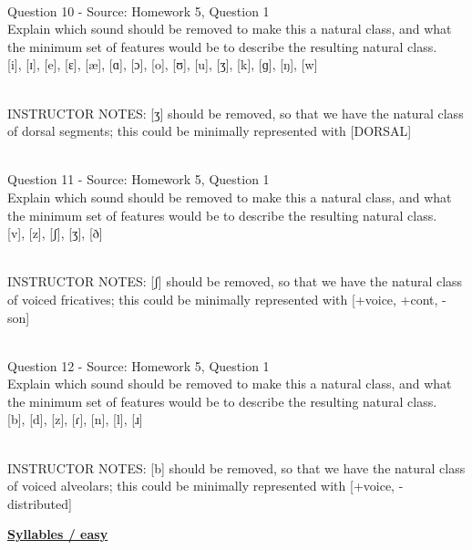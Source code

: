 \documentclass[12pt]{article}
\begin{document}
~\\

{\large Question 10} - Source: Homework 5, Question 1\\

Explain which sound should be removed to make this a natural class, and what the minimum set of features would be to describe the resulting natural class.\\

{[i]}, {[ɪ]}, {[e]}, {[ɛ]}, {[æ]}, {[ɑ]}, {[ɔ]}, {[o]}, {[ʊ]}, {[u]}, {[ʒ]}, {[k]}, {[ɡ]}, {[ŋ]}, {[w]}


~\\
INSTRUCTOR NOTES: [ʒ] should be removed, so that we have the natural class of dorsal segments; this could be minimally represented with [DORSAL]


~\\

{\large Question 11} - Source: Homework 5, Question 1\\

Explain which sound should be removed to make this a natural class, and what the minimum set of features would be to describe the resulting natural class.\\

{[v]}, {[z]}, {[ʃ]}, {[ʒ]}, {[ð]}


~\\
INSTRUCTOR NOTES: [ʃ] should be removed, so that we have the natural class of voiced fricatives; this could be minimally represented with [+voice, +cont, -son]


~\\

{\large Question 12} - Source: Homework 5, Question 1\\

Explain which sound should be removed to make this a natural class, and what the minimum set of features would be to describe the resulting natural class.\\

{[b]}, {[d]}, {[z]}, {[ɾ]}, {[n]}, {[l]}, {[ɹ]}


~\\
INSTRUCTOR NOTES: [b] should be removed, so that we have the natural class of voiced alveolars; this could be minimally represented with [+voice, -distributed]


\newpage\textbf{\underline{\huge Syllables / easy\\}}

~\\
\end{document}
